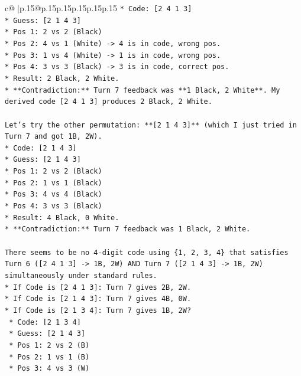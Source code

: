 \documentclass{article}
\begin{document}
{\begin{supertabular}{c@{$\;$}|p{.15\linewidth}@{}p{.15\linewidth}p{.15\linewidth}p{.15\linewidth}p{.15\linewidth}p{.15\linewidth}}
{{{\texttt{*   Code: {[}2 4 1 3{]}} \\
\texttt{*   Guess: {[}2 1 4 3{]}} \\
\texttt{*   Pos 1: 2 vs 2 (Black)} \\
\texttt{*   Pos 2: 4 vs 1 (White) {-}> 4 is in code, wrong pos.} \\
\texttt{*   Pos 3: 1 vs 4 (White) {-}> 1 is in code, wrong pos.} \\
\texttt{*   Pos 4: 3 vs 3 (Black) {-}> 3 is in code, correct pos.} \\
\texttt{*   Result: 2 Black, 2 White.} \\
\texttt{*   **Contradiction:** Turn 7 feedback was **1 Black, 2 White**. My derived code {[}2 4 1 3{]} produces 2 Black, 2 White.} \\
\\ 
\texttt{Let's try the other permutation: **{[}2 1 4 3{]}** (which I just tried in Turn 7 and got 1B, 2W).} \\
\texttt{*   Code: {[}2 1 4 3{]}} \\
\texttt{*   Guess: {[}2 1 4 3{]}} \\
\texttt{*   Pos 1: 2 vs 2 (Black)} \\
\texttt{*   Pos 2: 1 vs 1 (Black)} \\
\texttt{*   Pos 3: 4 vs 4 (Black)} \\
\texttt{*   Pos 4: 3 vs 3 (Black)} \\
\texttt{*   Result: 4 Black, 0 White.} \\
\texttt{*   **Contradiction:** Turn 7 feedback was 1 Black, 2 White.} \\
\\ 
\texttt{There seems to be no 4{-}digit code using \{1, 2, 3, 4\} that satisfies Turn 6 ({[}2 4 1 3{]} {-}> 1B, 2W) AND Turn 7 ({[}2 1 4 3{]} {-}> 1B, 2W) simultaneously under standard rules.} \\
\texttt{*   If Code is {[}2 4 1 3{]}: Turn 7 gives 2B, 2W.} \\
\texttt{*   If Code is {[}2 1 4 3{]}: Turn 7 gives 4B, 0W.} \\
\texttt{*   If Code is {[}2 1 3 4{]}: Turn 7 gives 1B, 2W?} \\
\texttt{    *   Code: {[}2 1 3 4{]}} \\
\texttt{    *   Guess: {[}2 1 4 3{]}} \\
\texttt{    *   Pos 1: 2 vs 2 (B)} \\
\texttt{    *   Pos 2: 1 vs 1 (B)} \\
\texttt{    *   Pos 3: 4 vs 3 (W)} \\
}}}
\end{supertabular}}
\end{document}
